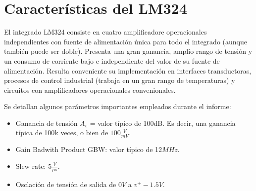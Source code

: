 \section{Características del LM324}

El integrado LM324 consiste en cuatro amplificadore operacionales independientes con fuente de alimentación única para todo el integrado (aunque también puede ser doble).
Presenta una gran ganancia, amplio rango de tensión y un consumo de corriente bajo e independiente del valor de su fuente de alimentación. Resulta conveniente su implementación en interfaces transductoras,
procesos de control industrial (trabaja en un gran rango de temperaturas) y circuitos con amplificadores operacionales convenionales. 

Se detallan algunos parámetros importantes empleados durante el informe:

\begin{itemize}
    \item Ganancia de tensión $A_{v}$ = valor típico de 100dB. Es decir, una ganancia típica de 100k veces, o bien de $100\frac{V}{mV}$.
\end{itemize}
\begin{itemize}
    \item Gain Badwith Product GBW: valor típico de 12$MHz$.
\end{itemize}
\begin{itemize}
    \item Slew rate: $5\frac{V}{\mu s}$.
\end{itemize}
\begin{itemize}
    \item Osclación de tensión de salida de $0V$ a $v^{+}- 1.5 V$.
\end{itemize}

